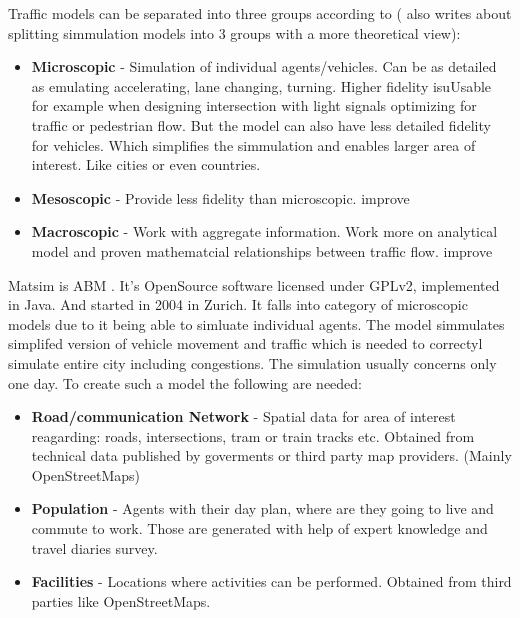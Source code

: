 \begin{kaobox}[frametitle=\text{Micro,Macro,Meno-Scopic}]

    Traffic models can be separated into three groups according to \cite{TrafficAnalysisTools}\cite{HomeAustroads}(\cite{lachowiczMicroscopicMesoscopicMacroscopic2011} also writes about splitting simmulation models into 3 groups with a more theoretical view):

    \begin{itemize}
        \item \textbf{Microscopic} - Simulation of individual agents/vehicles. Can be as detailed as emulating accelerating, lane changing, turning. Higher fidelity isuUsable for example when designing intersection with light signals optimizing for traffic or pedestrian flow. But the model can also have less detailed fidelity for vehicles. Which simplifies the simmulation and enables larger area of interest. Like cities or even countries.
        \item \textbf{Mesoscopic} - Provide less fidelity than microscopic. improve
        \item \textbf{Macroscopic} - Work with aggregate information. Work more on analytical model and proven mathematcial relationships between traffic flow. improve
    \end{itemize}
\end{kaobox}


Matsim  is \acrfull{ABM} . It's OpenSource software licensed under GPLv2, implemented in Java. And started in 2004 in Zurich. It falls into category of microscopic models due to it being able to simluate individual agents. The model simmulates simplifed version of vehicle movement and traffic which is needed to correctyl simulate entire city including congestions. The simulation usually concerns only one day. To create such a model the following are needed:
\begin{itemize}
    \item \textbf{Road/communication Network} - Spatial data for area of interest reagarding: roads, intersections, tram or train tracks etc. Obtained from technical data published by goverments or third party map providers. (Mainly OpenStreetMaps)
    \item \textbf{Population} - Agents with their day plan, where are they going to live and commute to work. Those are generated with help of expert knowledge and travel diaries survey.
    \item \textbf{Facilities} - Locations where activities can be performed. Obtained from third parties like OpenStreetMaps.
\end{itemize}

